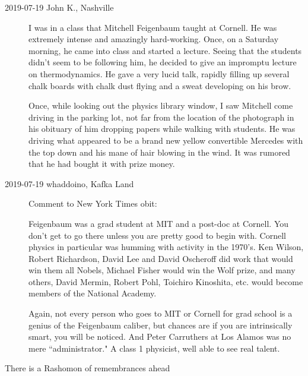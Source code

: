 \begin{description}
\item[2019-07-19 John K., Nashville]
I was in a class that Mitchell Feigenbaum taught at Cornell.  He was
extremely intense and amazingly hard-working.  Once, on a Saturday
morning, he came into class and started a lecture.  Seeing that the
students didn't seem to be following him, he decided to give an impromptu
lecture on thermodynamics.  He gave a very lucid talk, rapidly filling up
several chalk boards with chalk dust flying and a sweat developing on his
brow.

Once, while looking out the physics library window, I saw Mitchell come
driving in the parking lot, not far from the location of the photograph
in his obituary of him dropping papers while walking with students.  He
was driving what appeared to be a brand new yellow convertible Mercedes
with the top down and his mane of hair blowing in the wind.  It was
rumored that he had bought it with prize money.

\item[2019-07-19 whaddoino, Kafka Land]
Comment to New York Times obit:

Feigenbaum was a grad student at MIT and a post-doc at Cornell. You don't
get to go there unless you are pretty good to begin with. Cornell physics
in particular was humming with activity in the 1970's. Ken Wilson, Robert
Richardson, David Lee and David Oscheroff did work that would win them
all Nobels, Michael Fisher would win the Wolf prize, and many others,
David Mermin, Robert Pohl, Toichiro Kinoshita, etc. would become members
of the National Academy.

Again, not every person who goes to MIT or Cornell for grad school is a
genius of the Feigenbaum caliber, but chances are if you are
intrinsically smart, you will be noticed. And Peter Carruthers at Los
Alamos was no mere ``administrator." A class 1 physicist, well able to
see real talent.

\end{description}

There is a Rashomon of remembrances ahead


